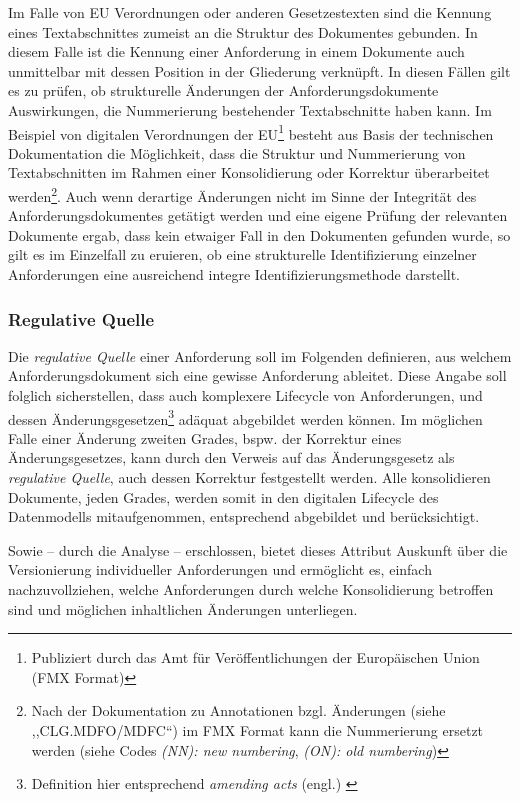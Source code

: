     \medskip
    Im Falle von \acs{EU} Verordnungen oder anderen Gesetzestexten sind die Kennung eines Textabschnittes zumeist an die Struktur des Dokumentes gebunden. 
    In diesem Falle ist die Kennung einer Anforderung in einem Dokumente auch unmittelbar mit dessen Position in der Gliederung verknüpft. 
    In diesen Fällen gilt es zu prüfen, ob strukturelle Änderungen der Anforderungsdokumente Auswirkungen, die Nummerierung bestehender Textabschnitte haben kann.
    Im Beispiel von digitalen Verordnungen der EU\footnote{Publiziert durch das Amt für Veröffentlichungen der Europäischen Union (FMX Format)} besteht aus Basis der technischen Dokumentation die Möglichkeit, dass die Struktur und Nummerierung von Textabschnitten im Rahmen einer Konsolidierung oder Korrektur überarbeitet werden\footnote{Nach der Dokumentation zu Annotationen bzgl. Änderungen (siehe ,,CLG.MDFO/MDFC``) im FMX Format kann die Nummerierung ersetzt werden (siehe Codes \textit{(NN): new numbering}, \textit{(ON): old numbering})\cite[vgl S. 76-79]{eu_fmx4_proc}}. 
    Auch wenn derartige Änderungen nicht im Sinne der Integrität des Anforderungsdokumentes getätigt werden und eine eigene Prüfung der relevanten Dokumente ergab, dass kein etwaiger Fall in den Dokumenten gefunden wurde, so gilt es im Einzelfall zu eruieren, ob eine strukturelle Identifizierung einzelner Anforderungen eine ausreichend integre Identifizierungsmethode darstellt. 

\subsubsection{Regulative Quelle}
    
    Die \textit{regulative Quelle} einer Anforderung soll im Folgenden definieren, aus welchem Anforderungsdokument sich eine gewisse Anforderung ableitet. 
    Diese Angabe soll folglich sicherstellen, dass auch komplexere Lifecycle von Anforderungen, und dessen Änderungsgesetzen\footnote{Definition hier entsprechend  \textit{amending acts} (engl.) \cite{eu_consolidation}} adäquat abgebildet werden können.
    Im möglichen Falle einer Änderung zweiten Grades, bspw. der Korrektur eines Änderungsgesetzes, kann durch den Verweis auf das Änderungsgesetz als \textit{regulative Quelle}, auch dessen Korrektur festgestellt werden. 
    Alle konsolidieren Dokumente, jeden Grades, werden somit in den digitalen Lifecycle des Datenmodells mitaufgenommen, entsprechend abgebildet und berücksichtigt.  

    \medskip
    Sowie -- durch die Analyse -- erschlossen, bietet dieses Attribut Auskunft über die Versionierung individueller Anforderungen und ermöglicht es, einfach nachzuvollziehen, welche Anforderungen durch welche Konsolidierung betroffen sind und möglichen inhaltlichen Änderungen unterliegen.
    
